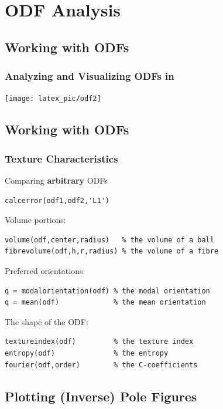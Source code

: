 \section*{ODF Analysis}

\subsection*{Working with ODFs}

\begin{frame}
  \frametitle{Analyzing and Visualizing ODFs in \MTEX}

  \begin{center}
    \texttt{[image: latex\_pic/odf2]}
  \end{center}
\end{frame}

\subsection*{Working with ODFs}

\begin{frame}[fragile]
  \frametitle{Texture Characteristics}

Comparing {\bf arbitrary} ODFs
\begin{lstlisting}
calcerror(odf1,odf2,'L1')
\end{lstlisting}

\pause

Volume portions:
\begin{lstlisting}
volume(odf,center,radius)   % the volume of a ball
fibrevolume(odf,h,r,radius) % the volume of a fibre
\end{lstlisting}

\pause

Preferred orientations:
\begin{lstlisting}
q = modalorientation(odf) % the modal orientation
q = mean(odf)             % the mean orientation
\end{lstlisting}

\pause

The shape of the ODF:
\begin{lstlisting}
textureindex(odf)         % the texture index
entropy(odf)              % the entropy
fourier(odf,order)        % the C-coefficients
\end{lstlisting}


\end{frame}


\subsection*{Plotting (Inverse) Pole Figures}

